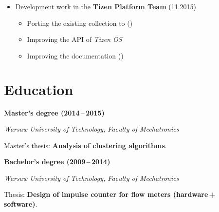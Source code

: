 \documentclass[a4paper,10pt]{article}
\begin{document}
\begin{itemize}[leftmargin=15pt,itemsep=3pt]
  \item Development work in the {\bfseries Tizen Platform Team} \hfill{} (11.2015)
  \begin{itemize}
    \item Porting the existing  collection to  ()
    \item Improving the  API of \textit{Tizen OS}
    \item Improving the documentation ()
  \end{itemize}
\end{itemize}

\pagebreak{}
\section{Education}
{\large\textbf{Master's degree \hfill (2014\,--\,2015)}} \par
\textit{Warsaw University of Technology, Faculty of Mechatronics}\par
Master's thesis: \textbf{Analysis of clustering algorithms}.\par

\vspace{12pt}
{\large\textbf{Bachelor's degree \hfill (2009\,--\,2014)}} \par
\textit{Warsaw University of Technology, Faculty of Mechatronics}\par
Thesis: \textbf{Design of impulse counter for flow meters (hardware\,+\,software)}.\par
\end{document}
